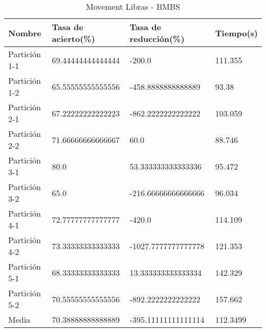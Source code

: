 \begin{table}[H]
	\centering
	\begin{tabular}{l|lll}
		Nombre        & Tasa de acierto(\%) & Tasa de reducción(\%) & Tiempo(s) \\ \hline
		Partición 1-1 & 69.44444444444444   & -200.0                & 111.355   \\
		Partición 1-2 & 65.55555555555556   & -458.8888888888889    & 93.38     \\
		Partición 2-1 & 67.22222222222223   & -862.2222222222222    & 103.059   \\
		Partición 2-2 & 71.66666666666667   & 60.0                  & 88.746    \\
		Partición 3-1 & 80.0                & 53.333333333333336    & 95.472    \\
		Partición 3-2 & 65.0                & -216.66666666666666   & 96.034    \\
		Partición 4-1 & 72.77777777777777   & -420.0                & 114.109   \\
		Partición 4-2 & 73.33333333333333   & -1027.7777777777778   & 121.353   \\
		Partición 5-1 & 68.33333333333333   & 13.333333333333334    & 142.329   \\
		Partición 5-2 & 70.55555555555556   & -892.2222222222222    & 157.662   \\ \hline
		Media         & 70.38888888888889   & -395.11111111111114   & 112.3499
	\end{tabular}
	\caption{Movement Libras - BMBS}
	\label{MLIB-BMBS}
\end{table}